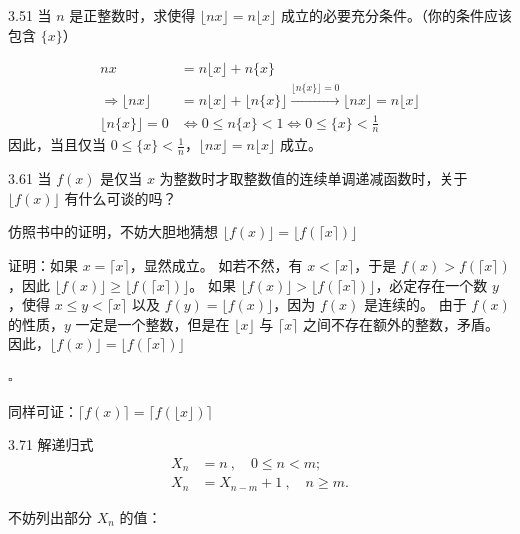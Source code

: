 \begin{problem}{3.5}{1}
  当 \( n \) 是正整数时，求使得 \( \lfloor n x \rfloor = n \lfloor x \rfloor \) 成立的必要充分条件。（你的条件应该包含 \( \{x\} \)）
\end{problem}

\begin{align*}
  nx & = n \lfloor x \rfloor + n \{ x \} \\
  \Rightarrow
  \lfloor nx \rfloor & = n \lfloor x \rfloor + \lfloor n \{ x \} \rfloor  \xrightarrow{\lfloor n \{ x \} \rfloor = 0} \lfloor n x \rfloor = n \lfloor x \rfloor \\
  \lfloor n \{ x \} \rfloor = 0 & \Leftrightarrow 0 \le n \{ x \} < 1 \Leftrightarrow 0 \le \{ x \} < \frac{1}{n}
\end{align*}
因此，当且仅当 \( 0 \le \{ x \} < \frac{1}{n} \)，\( \lfloor n x \rfloor = n \lfloor x \rfloor \) 成立。

\begin{problem}{3.6}{1}
  当 \( f(x) \) 是仅当 \( x \) 为整数时才取整数值的连续单调递减函数时，关于 \( \lfloor f(x) \rfloor \) 有什么可谈的吗？
\end{problem}

仿照书中的证明，不妨大胆地猜想 \( \lfloor f(x) \rfloor = \lfloor f( \lceil x \rceil) \rfloor \)

证明：如果 \( x = \lceil x \rceil \)，显然成立。
如若不然，有 \( x < \lceil x \rceil \)，于是 \( f(x) > f(\lceil x \rceil) \)，因此 \( \lfloor f(x) \rfloor \ge \lfloor f(\lceil x \rceil) \rfloor \)。
如果 \( \lfloor f(x) \rfloor > \lfloor f(\lceil x \rceil) \rfloor \)，必定存在一个数 \( y \)，使得 \( x \le y < \lceil x \rceil \) 以及 \( f(y) = \lfloor f(x) \rfloor \)，因为 \( f(x) \) 是连续的。
由于 \( f(x) \) 的性质，\( y \) 一定是一个整数，但是在 \( \lfloor x \rfloor \) 与 \( \lceil x \rceil \) 之间不存在额外的整数，矛盾。
因此，\( \lfloor f(x) \rfloor = \lfloor f(\lceil x \rceil) \rfloor \)

\hfill \( \square \)

同样可证：\( \lceil f(x) \rceil = \lceil f( \lfloor x \rfloor) \rceil \)

\begin{problem}{3.7}{1}
  解递归式
  \begin{align*}
    X_n &= n \ , \quad 0 \le n < m; \\
    X_n &= X_{n-m}+1 \ , \quad n \ge m.
  \end{align*}
\end{problem}

不妨列出部分 \( X_n \) 的值：

